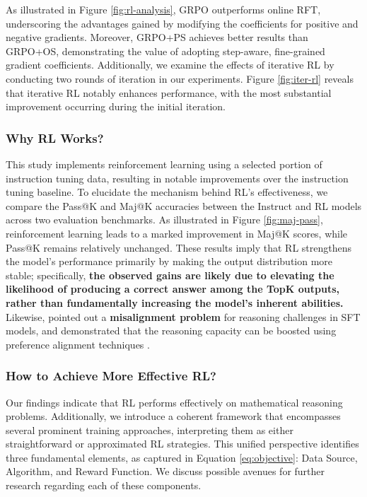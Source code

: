 \begin{itemize}[topsep=0pt]
As illustrated in Figure \ref{fig:rl-analysis}, GRPO outperforms online RFT, underscoring the advantages gained by modifying the coefficients for positive and negative gradients. Moreover, GRPO+PS achieves better results than GRPO+OS, demonstrating the value of adopting step-aware, fine-grained gradient coefficients. Additionally, we examine the effects of iterative RL by conducting two rounds of iteration in our experiments. Figure \ref{fig:iter-rl} reveals that iterative RL notably enhances performance, with the most substantial improvement occurring during the initial iteration.

\subsubsection{Why RL Works?} This study implements reinforcement learning using a selected portion of instruction tuning data, resulting in notable improvements over the instruction tuning baseline. To elucidate the mechanism behind RL’s effectiveness, we compare the Pass@K and Maj@K accuracies between the Instruct and RL models across two evaluation benchmarks. As illustrated in Figure \ref{fig:maj-pass}, reinforcement learning leads to a marked improvement in Maj@K scores, while Pass@K remains relatively unchanged. These results imply that RL strengthens the model’s performance primarily by making the output distribution more stable; specifically, \textbf{the observed gains are likely due to elevating the likelihood of producing a correct answer among the TopK outputs, rather than fundamentally increasing the model’s inherent abilities.} Likewise, \citep{wang2023making} pointed out a \textbf{misalignment problem} for reasoning challenges in SFT models, and demonstrated that the reasoning capacity can be boosted using preference alignment techniques \citep{yuan2023rrhf,song2023preference,wang2023making}.

\subsubsection{How to Achieve More Effective RL?}
\label{sec:effec_rl}
Our findings indicate that RL performs effectively on mathematical reasoning problems. Additionally, we introduce a coherent framework that encompasses several prominent training approaches, interpreting them as either straightforward or approximated RL strategies. This unified perspective identifies three fundamental elements, as captured in Equation \ref{eq:objective}: Data Source, Algorithm, and Reward Function. We discuss possible avenues for further research regarding each of these components.


\end{itemize}
